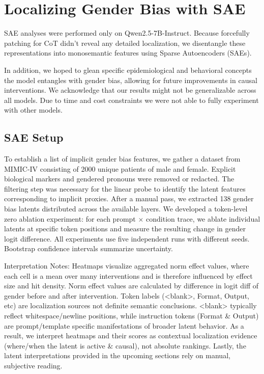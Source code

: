 \documentclass[11pt]{article}
\begin{document}
\section{Localizing Gender Bias with SAE}
SAE analyses were performed only on Qwen2.5-7B-Instruct. Because forcefully patching for CoT didn't reveal any detailed localization, we disentangle these representations into monosemantic features using Sparse Autoencoders (SAEs).

In addition, we hoped to glean specific epidemiological and behavioral concepts the model entangles with gender bias, allowing for future improvements in causal interventions. We acknowledge that our results might not be generalizable across all models. Due to time and cost constraints we were not able to fully experiment with other models. 


\subsection{SAE Setup}
To establish a list of implicit gender bias features, we gather a dataset from MIMIC-IV consisting of 2000 unique patients of male and female. Explicit biological markers and gendered pronouns were removed or redacted. The filtering step was necessary for the linear probe to identify the latent features corresponding to implicit proxies. After a manual pass, we extracted 138 gender bias latents distributed across the available layers. We developed a token-level zero ablation experiment: for each prompt $\times$ condition trace, we ablate individual latents at specific token positions and measure the resulting change in gender logit difference. All experiments use five independent runs with different seeds. Bootstrap confidence intervals summarize uncertainty.

Interpretation Notes: Heatmaps visualize aggregated norm effect values, where each cell is a mean over many interventions and is therefore influenced by effect size and hit density. Norm effect values are calculated by difference in logit diff of gender before and after intervention. Token labels (<blank>, Format, Output, etc) are localization sources not definite semantic conclusions. <blank> typically reflect whitespace/newline positions, while instruction tokens (Format \& Output) are prompt/template specific manifestations of broader latent behavior. As a result, we interpret heatmaps and their scores as contextual localization evidence (where/when the latent is active \& causal), not absolute rankings. Lastly, the latent interpretations provided in the upcoming sections rely on manual, subjective reading.
\end{document}
